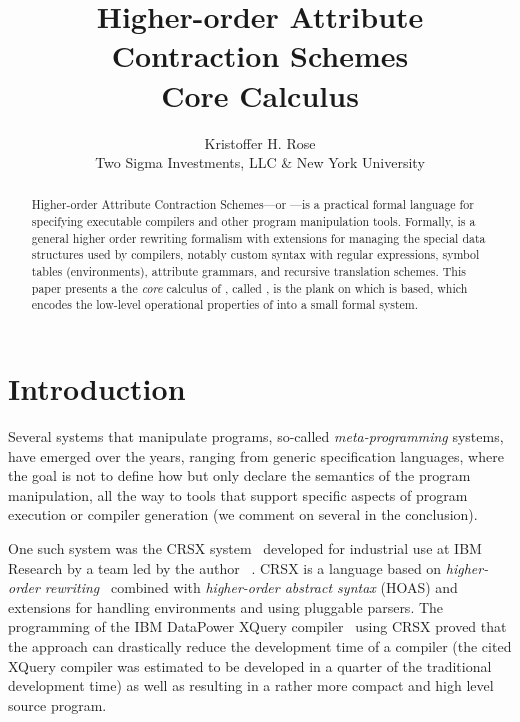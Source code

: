 \documentclass[letterpaper,11pt]{article}
\title{ Higher-order Attribute Contraction Schemes \\ Core Calculus }
\author{ Kristoffer H. Rose \\
 Two Sigma Investments, LLC \& New York University
}
\begin{document}
\maketitle

\begin{abstract}\noindent
  Higher-order Attribute Contraction Schemes---or \HAX---is a practical formal language for
  specifying executable compilers and other program manipulation tools.
  Formally, \HAX is a general higher order rewriting formalism with extensions for managing the
  special data structures used by compilers, notably custom syntax with regular expressions, symbol
  tables (\aka environments), attribute grammars, and recursive translation schemes.
  This paper presents a the \emph{core} calculus of \HAX, called \hax, is the plank on which \HAX is
  based, which encodes the low-level operational properties of \HAX into a small formal system.
\end{abstract}


\section{Introduction}\label{sec:intro}

Several systems that manipulate programs, so-called \emph{meta-programming} systems, have emerged
over the years, ranging from generic specification languages, where the goal is not to define how
but only declare the semantics of the program manipulation, all the way to tools that support
specific aspects of program execution or compiler generation (we comment on several in the
conclusion).

One such system was the CRSX system~\cite{Rose:1996} developed for industrial use at IBM Research by
a team led by the author~\cite{Rose:hor2010,Rose:rta2011,crsx} .  CRSX is a language based on
\emph{higher-order rewriting}~\cite{Jouannaud:klop2005} combined with \emph{higher-order abstract
  syntax} (HOAS) \cite{PfenningElliot:pldi1988} and extensions for handling environments and using
pluggable parsers.  The programming of the IBM Data\-Power XQuery compiler~\cite{dp60:ibm2013} using
CRSX proved that the approach can drastically reduce the development time of a compiler (the cited
XQuery compiler was estimated to be developed in a quarter of the traditional development time) as
well as resulting in a rather more compact and high level source program.
\end{document}
